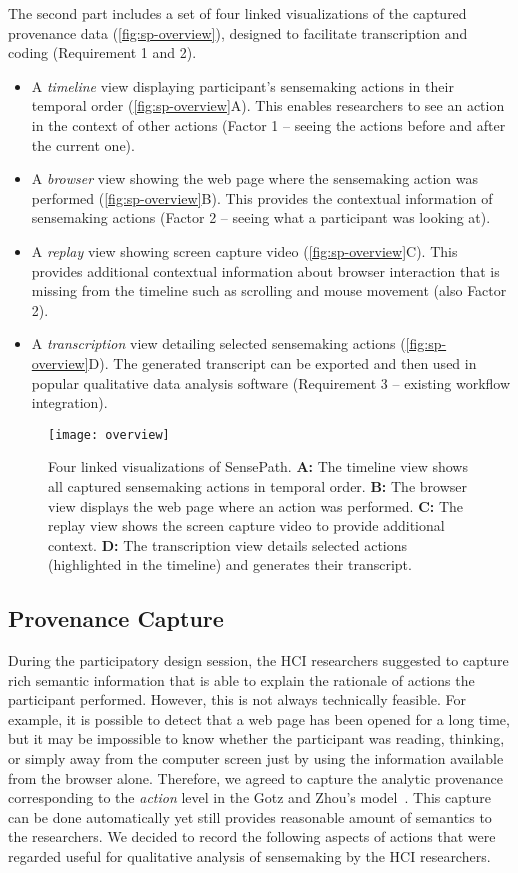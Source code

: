 The second part includes a set of four linked visualizations of the captured provenance data (\autoref{fig:sp-overview}), designed to facilitate transcription and coding (Requirement 1 and 2).

\begin{itemize}
\item A \emph{timeline} view displaying participant's sensemaking actions in their temporal order (\autoref{fig:sp-overview}A). This enables researchers to see an action in the context of other actions (Factor 1 -- seeing the actions before and after the current one).
\item A \emph{browser} view showing the web page where the sensemaking action was performed (\autoref{fig:sp-overview}B). This provides the contextual information of sensemaking actions (Factor 2 -- seeing what a participant was looking at).
\item A \emph{replay} view showing screen capture video (\autoref{fig:sp-overview}C). This provides additional contextual information about browser interaction that is missing from the timeline such as scrolling and mouse movement (also Factor 2).
\item A \emph{transcription} view detailing selected sensemaking actions (\autoref{fig:sp-overview}D). The generated transcript can be exported and then used in popular qualitative data analysis software (Requirement 3 -- existing workflow integration).
\end{itemize}

\begin{figure}[!htb]
 	\centering
 	\texttt{[image: overview]}
 	\caption{Four linked visualizations of SensePath. \textbf{A:} The timeline view shows all captured sensemaking actions in temporal order. \textbf{B:} The browser view displays the web page where an action was performed. \textbf{C:} The replay view shows the screen capture video to provide additional context. \textbf{D:} The transcription view details selected actions (highlighted in the timeline) and generates their transcript.}
 	\label{fig:sp-overview}
\end{figure}

\subsection{Provenance Capture}
\label{sub:sp-provenance}
During the participatory design session, the HCI researchers suggested to capture rich semantic  information that is able to explain the rationale of actions the participant performed. However, this is not always technically feasible. For example, it is possible to detect that a web page has been opened for a long time, but it may be impossible to know whether the participant was reading, thinking, or simply away from the computer screen just by using the information available from the browser alone. Therefore, we agreed to capture the analytic provenance corresponding to the \emph{action} level in the Gotz and Zhou's model~\cite{Gotz2009}. This capture can be done automatically yet still provides reasonable amount of semantics to the researchers. We decided to record the following aspects of actions that were regarded useful for qualitative analysis of sensemaking by the HCI researchers.

